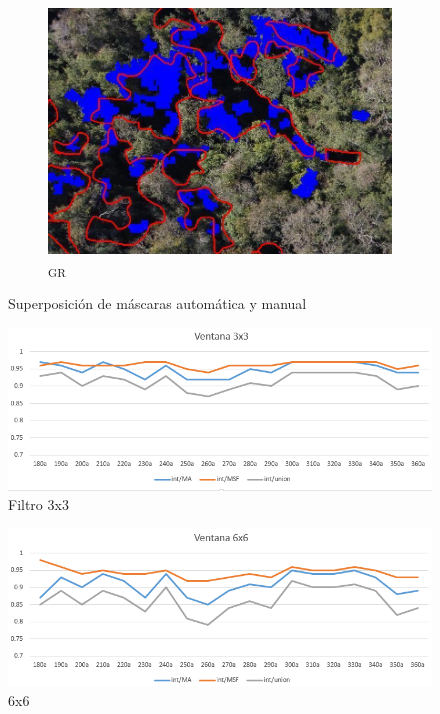 \begin{figure}[h!]
 \begin{subfigure}[b]{0.5\textwidth}
    \includegraphics[width=\textwidth]{Imagenes/green minus red 85.png}
     \hfill
     \caption{\textpsi\textsubscript{GR}}
    \label{verderojo}
 \end{subfigure}
 \caption{Superposición de máscaras automática y manual}
        \label{p85BRBGGR}
\end{figure}

\begin{figure}[h!]
    \includegraphics[width=\textwidth]{Imagenes/filter 3x3.png}
     \hfill
     \caption{Filtro 3x3}
    \label{filter3x3}
\end{figure}

\begin{figure}[h!]
    \includegraphics[width=\textwidth]{Imagenes/filter 6x6.png}
     \hfill
     \caption{6x6}
    \label{filter6x6}
\end{figure}

